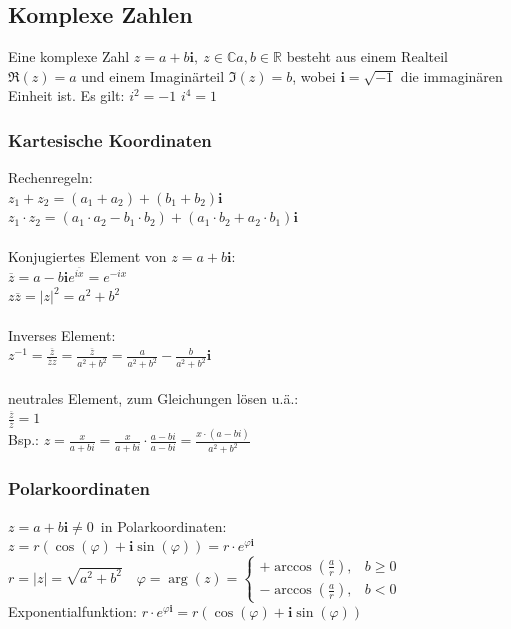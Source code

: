 \documentclass[6pt,a4paper]{scrartcl}
\newcommand{\R}{\ensuremath{\mathbb R}}
\begin{document}
\begin{multicols}{4}
\subsection{Komplexe Zahlen}
Eine komplexe Zahl $z=a+b\mathbf{i},\ z\in \mathbb C a,b \in \R$ besteht aus einem Realteil $\Re(z)=a$ und einem Imaginärteil $\Im(z)=b$, wobei $\mathbf{i}=\sqrt{-1}$ die immaginären Einheit ist.
Es gilt: \quad $i^2 = -1$ \quad $i^4 = 1$ \\
\subsubsection{Kartesische Koordinaten}
Rechenregeln:\\
$z_1+z_2=(a_1+a_2)+(b_1+b_2)\mathbf{i}$\\
$z_1\cdot z_2=(a_1\cdot a_2-b_1\cdot b_2)+(a_1\cdot b_2+a_2\cdot b_1)\mathbf{i}$\\
\\
Konjugiertes Element von $z=a+b\mathbf{i}$:\\
$\overline{z}=a-b\mathbf{i}$\qquad \qquad \qquad \qquad \qquad \qquad \qquad \qquad $e^{\overline{ix}} = e^{-ix}$  \\
$z\overline{z}=|z|^2=a^2+b^2$\\
\\
Inverses Element:\\
$z^{-1}=\frac{\overline z}{\overline z z}=\frac{\overline z}{a^2+b^2}=\frac{a}{a^2+b^2} - \frac{b}{a^2+b^2}\mathbf{i}$ \\
\\
neutrales Element, zum Gleichungen lösen u.ä.: \\ 
$\frac{\overline{z}}{\overline{z}}=1$ \\
Bsp.: $z=\frac{x}{a+b i}=\frac{x}{a+bi}\cdot\frac{a-bi}{a-bi}=\frac{x\cdot(a-bi)}{a^2+b^2}$

\subsubsection{Polarkoordinaten}
$z=a+b\mathbf{i}\ne0$\ in Polarkoordinaten:\\
$z=r (\cos(\varphi)+\mathbf{i}\sin(\varphi))=r\cdot e^{\varphi \mathbf{i}}$\\
$r=|z|=\sqrt{a^2+b^2}\quad\varphi=\arg(z)=\begin{cases}+\arccos \left( \frac{a}{r}\right),  & b\ge0   \\  -\arccos \left( \frac{a}{r}\right), & b<0\end{cases}$ \\
Exponentialfunktion: $r\cdot e^{\varphi \mathbf{i}}=r (\cos(\varphi)+\mathbf{i}\sin(\varphi))$\\


\end{multicols}
\end{document}
